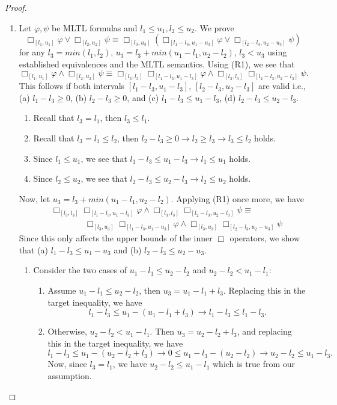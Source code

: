 \documentclass{article}
\begin{document}
\begin{proof}
\begin{enumerate}
    \item[(R2):] Let $\varphi,\psi$ be MLTL formulas and $l_1 \leq u_1, l_2 \leq u_2$. We prove 
    $$
        \Box_{[l_1,u_1]}{\varphi} \lor \Box_{[l_2,u_2]}{\psi} \equiv \Box_{[l_3,u_3]}{(\Box_{[l_1-l_3,u_1-u_3]}{\varphi} \lor \Box_{[l_2-l_3,u_2-u_3]}{\psi})}
    $$ 
    for any $l_3 = min(l_1,l_2)$, $u_3 = l_3 + min(u_1-l_1,u_2-l_2)$, $l_3 < u_3$ using established equivalences and the MLTL semantics. 
    Using (R1), we see that 
    $$
        \Box_{[l_1,u_1]}{\varphi} \land \Box_{[l_2,u_2]}{\psi} \equiv \Box_{[l_3,l_3]}{\Box_{[l_1-l_3,u_1-l_3]}{\varphi} \land \Box_{[l_3,l_3]}{\Box_{[l_2-l_3,u_2-l_3]}{\psi}}}.
    $$
    This follows if both intervals $[l_1-l_3,u_1-l_3]$, $[l_2-l_3,u_2-l_3]$ are valid i.e., (a) $l_1-l_3 \geq 0$, (b) $l_2-l_3 \geq 0$, and (c) $l_1-l_3 \leq u_1-l_3$, (d) $l_2-l_3 \leq u_2-l_3$. 
    \begin{enumerate}
    \item Recall that $l_3 = l_1$, then $l_3 \leq l_1$.
    \item Recall that $l_3 = l_1 \leq l_2$, then $l_2-l_3 \geq 0 \rightarrow l_2 \geq l_3 \rightarrow l_3 \leq l_2$ holds.
    \item Since $l_1 \leq u_1$, we see that $l_1-l_3 \leq u_1-l_3 \rightarrow l_1 \leq u_1$ holds.
    \item Since $l_2 \leq u_2$, we see that $l_2-l_3 \leq u_2-l_3 \rightarrow l_2 \leq u_2$ holds.
    \end{enumerate}
Now, let $u_3 = l_3+min(u_1-l_1,u_2-l_2)$. Applying (R1) once more, we have
\begin{align*}
& \Box_{[l_3,l_3]}{\Box_{[l_1-l_3,u_1-l_3]}{\varphi} \land \Box_{[l_3,l_3]}{\Box_{[l_2-l_3,u_2-l_3]}{\psi}}} \equiv \\ 
& \qquad \qquad \Box_{[l_3,u_3]}{\Box_{[l_1-l_3,u_1-u_3]}{\varphi}} \land \Box_{[l_3,u_3]}{\Box_{[l_2-l_3,u_2-u_3]}{\psi}}
\end{align*}
Since this only affects the upper bounds of the inner $\Box_{}{}$ operators, we show that (a) $l_1-l_3 \leq u_1-u_3$ and (b) $l_2-l_3 \leq u_2-u_3$.
    \begin{enumerate}
    \item Consider the two cases of $u_1-l_1 \leq u_2-l_2$ and $u_2-l_2 < u_1-l_1$:
        \begin{enumerate}
            \item Assume $u_1-l_1 \leq u_2-l_2$, then $u_3 = u_1-l_1+l_3$. 
                Replacing this in the target inequality, we have 
                $$
                    l_1-l_3 \leq u_1-(u_1-l_1+l_3) \rightarrow l_1-l_3 \leq l_1-l_3.
                $$
            \item Otherwise, $u_2-l_2 < u_1-l_1$. 
                Then $u_3 = u_2-l_2+l_3$, and replacing this in the target inequality, we have 
                $$
                    l_1-l_3 \leq u_1-(u_2-l_2+l_3) \rightarrow 0 \leq u_1-l_3-(u_2-l_2) \rightarrow u_2-l_2 \leq u_1-l_3.
                $$ 
                Now, since $l_3=l_1$, we have $u_2-l_2 \leq u_1-l_1$ which is true from our assumption. 
                \end{enumerate}
    

\end{enumerate}
\end{enumerate}
\end{proof}
\end{document}
